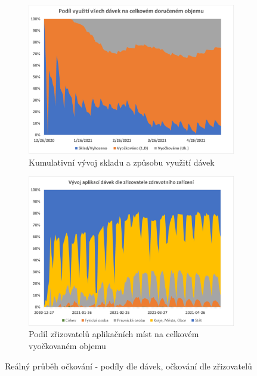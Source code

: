 \begin{figure}
\centering


\begin{subfigure}{0.9\textwidth}
\includegraphics[width=\textwidth]{assets/gr_vyuziti}
\caption{Kumulativní vývoj skladu a způsobu využití dávek}
\label{gr_vyuziti}
\end{subfigure}

\begin{subfigure}{0.9\textwidth}
\includegraphics[width=\textwidth]{assets/chart_zrizovatele}
\caption{Podíl zřizovatelů aplikačních míst na celkovém vyočkovaném objemu}
\label{gr_vyuziti_zrizovatele}
\end{subfigure}

\caption{Reálný průběh očkování - podíly dle dávek, očkování dle zřizovatelů}
\end{figure}



